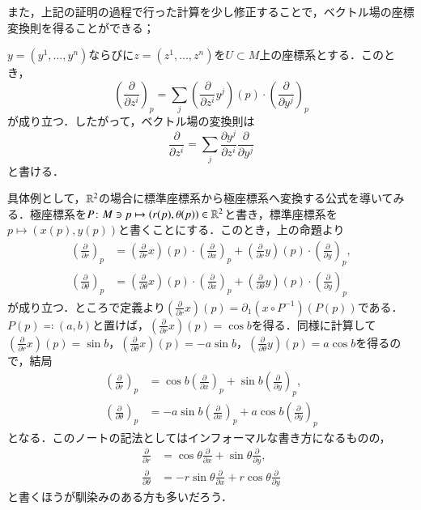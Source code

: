 また，上記の証明の過程で行った計算を少し修正することで，ベクトル場の座標変換則を得ることができる；

\begin{prop}
$y=(y^1, \dots, y^n)$ならびに$z = (z^1,\dots, z^n)$を$U \subset M$上の座標系とする．このとき，
\begin{equation}
\left( \frac{\partial}{\partial z^i} \right)_p = \sum_{j} \left( \frac{\partial }{\partial z^i} y^j \right) (p) \cdot \left( \frac{\partial}{\partial y^j} \right)_p
\end{equation}が成り立つ．したがって，ベクトル場の変換則は
\begin{equation}
\frac{\partial}{\partial z^i} = \sum_{j} \frac{\partial y^j}{\partial z^i} \frac{\partial}{\partial y^j}
\end{equation}と書ける．
\end{prop}

\begin{exm}
具体例として，$\mathbb{R}^2$の場合に標準座標系から極座標系へ変換する公式を導いてみる．極座標系を$P \colon M \ni p \mapsto (r(p), \theta(p)) \in \mathbb{R}^2$と書き，標準座標系を$p \mapsto (x(p), y(p))$と書くことにする．このとき，上の命題より
\begin{align}
\left( \frac{\partial}{\partial r} \right)_p &= \left( \frac{\partial}{\partial r} x\right)(p) \cdot \left( \frac{\partial}{\partial x} \right)_p + \left( \frac{\partial}{\partial r} y\right)(p) \cdot \left( \frac{\partial}{\partial y} \right)_p, \\
\left( \frac{\partial}{\partial \theta} \right)_p &= \left( \frac{\partial}{\partial \theta} x\right)(p) \cdot \left( \frac{\partial}{\partial x} \right)_p + \left( \frac{\partial}{\partial \theta} y\right)(p) \cdot \left( \frac{\partial}{\partial y} \right)_p
\end{align}が成り立つ．ところで定義より$\left( \frac{\partial}{\partial r} x\right)(p) = \partial_1(x \circ P^{-1})(P(p)) $である．$P(p) \eqqcolon (a,b)$と置けば，$\left( \frac{\partial}{\partial r} x\right)(p) = \cos b$を得る．同様に計算して$\left( \frac{\partial}{\partial r} x\right)(p) = \sin b$，$\left( \frac{\partial}{\partial \theta} x\right)(p) = - a \sin b$，$\left( \frac{\partial}{\partial \theta} y\right)(p) = a \cos b$を得るので，結局
\begin{align}
\left( \frac{\partial}{\partial r} \right)_p &= \cos b \left( \frac{\partial}{\partial x} \right)_p + \sin b \left( \frac{\partial}{\partial y} \right)_p, \\
\left( \frac{\partial}{\partial \theta} \right)_p &= - a\sin b \left( \frac{\partial}{\partial x} \right)_p + a \cos b \left( \frac{\partial}{\partial y} \right)_p
\end{align}となる．このノートの記法としてはインフォーマルな書き方になるものの，
\begin{align}
\frac{\partial}{\partial r} &= \cos \theta \frac{\partial}{\partial x} + \sin \theta \frac{\partial}{\partial y}, \\
\frac{\partial}{\partial \theta} &= - r\sin \theta \frac{\partial}{\partial x} + r \cos \theta \frac{\partial}{\partial y}
\end{align}と書くほうが馴染みのある方も多いだろう．
\end{exm}

